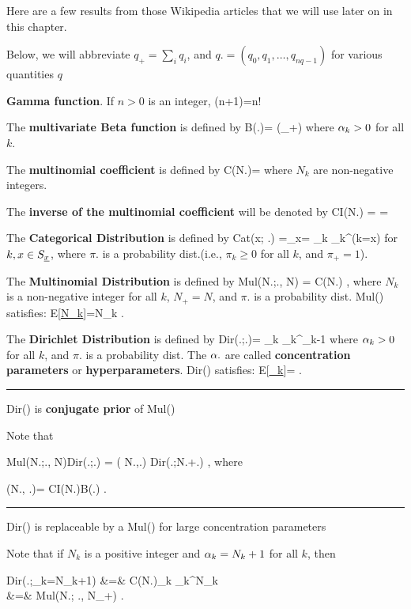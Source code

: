 Here are a few 
results 
from those Wikipedia
articles that we
will use later on
in this chapter.

Below,
we will abbreviate
$q_+=\sum_i q_i$, and
$q.=(q_0, q_1, \ldots, q_{nq-1})$
for various quantities $q$

{\bf Gamma function}. If $n>0$ is an integer,
\beq
\Gamma(n+1)=n!
\eeq

The {\bf multivariate Beta function} 
is defined by
\beq
B(\alp.)=
{\Gamma(\alp_+)}
\eeq
where $\alpha_k>0$ for all $k$.

The {\bf multinomial coefficient}
is defined by
\beq
C(N.)=
\eeq
where $N_k$ are non-negative
integers.

The {\bf inverse of the multinomial 
coefficient} will
be denoted by
\beq
CI(N.)
=
=
\eeq

The {\bf Categorical Distribution}
is defined by
\beq
Cat(x; \pi.)
=\pi_x=
\prod_{k} \pi_k^{\indi(k=x)}
\eeq
for $k, x\in S_{\underline{x}}$,
where 
$\pi.$ is a
probability dist.(i.e., $\pi_k\geq 0$
for all $k$,
and $\pi_+=1$).



The {\bf Multinomial Distribution}
is defined by
\beq
Mul(N.;\pi., N)
=
C(N.)
\;,
\eeq
where $N_k$
is a non-negative
integer for all $k$,
$N_+=N$,
and $\pi.$
is a probability dist.
Mul() satisfies:
\beq
E[\ul{N_k}]=N\pi_k
\;.
\label{eq-exp-val-mul}
\eeq

The {\bf Dirichlet Distribution}
is defined by
\beq
Dir(\pi.;\alp.)=
\prod_k
\pi_k^{\alp_k-1}
\eeq
where $\alpha_k>0$
for all $k$,
and $\pi.$
is a probability dist.
The
$\alpha.$ are called 
{\bf concentration parameters}
or {\bf hyperparameters}.
Dir() satisfies:
\beq
E[\ul{\pi_k}]=
\;.
\label{eq-exp-val-dir}
\eeq


\hrule\noindent
Dir() is {\bf conjugate prior} of  Mul()

Note that

\beq
Mul(N.;\pi., N)Dir(\pi.;\alp.)
=
\calk( N.,\alp.)
Dir(\pi.;N.+\alp.)
\;,
\eeq
where

\beq
\calk(N., \alp.)=
{CI(N.)B(\alp.)}
\;.
\eeq
\hrule\noindent
Dir() is replaceable by a Mul()
for large concentration parameters

Note that if $N_k$ is a positive  integer
and
$\alpha_k=N_k+1$ for all $k$, then

\beqa 
Dir(\pi.;\alp_k=N_k+1)
&=&
C(N.)\prod_k \pi_k^{N_k}
\\
&=&
Mul(N.; \pi., N_+)
\;.
\eeqa

